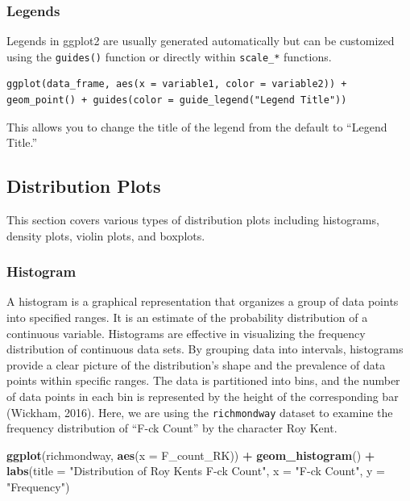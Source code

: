 \documentclass[
]{book}
\newenvironment{Shaded}{\begin{snugshade}}{\end{snugshade}}
\newcommand{\AttributeTok}[1]{\textcolor[rgb]{0.13,0.29,0.53}{#1}}
\newcommand{\FunctionTok}[1]{\textcolor[rgb]{0.13,0.29,0.53}{\textbf{#1}}}
\newcommand{\NormalTok}[1]{#1}
\newcommand{\SpecialCharTok}[1]{\textcolor[rgb]{0.81,0.36,0.00}{\textbf{#1}}}
\newcommand{\StringTok}[1]{\textcolor[rgb]{0.31,0.60,0.02}{#1}}
\begin{document}
\subsubsection*{Legends}\label{legends}

Legends in ggplot2 are usually generated automatically but can be customized using the \texttt{guides()} function or directly within \texttt{scale\_*} functions.

\begin{verbatim}
ggplot(data_frame, aes(x = variable1, color = variable2)) + geom_point() + guides(color = guide_legend("Legend Title"))
\end{verbatim}

This allows you to change the title of the legend from the default to ``Legend Title.''

\subsection*{Distribution Plots}\label{distribution-plots}

This section covers various types of distribution plots including histograms, density plots, violin plots, and boxplots.

\subsubsection*{Histogram}\label{histogram}

A histogram is a graphical representation that organizes a group of data points into specified ranges. It is an estimate of the probability distribution of a continuous variable. Histograms are effective in visualizing the frequency distribution of continuous data sets. By grouping data into intervals, histograms provide a clear picture of the distribution's shape and the prevalence of data points within specific ranges. The data is partitioned into bins, and the number of data points in each bin is represented by the height of the corresponding bar (Wickham, 2016). Here, we are using the \texttt{richmondway} dataset to examine the frequency distribution of ``F-ck Count'' by the character Roy Kent.

\begin{Shaded}
\begin{Highlighting}[]
\FunctionTok{ggplot}\NormalTok{(richmondway, }\FunctionTok{aes}\NormalTok{(}\AttributeTok{x =}\NormalTok{ F\_count\_RK)) }\SpecialCharTok{+}
  \FunctionTok{geom\_histogram}\NormalTok{() }\SpecialCharTok{+}
  \FunctionTok{labs}\NormalTok{(}\AttributeTok{title =} \StringTok{"Distribution of Roy Kent\textquotesingle{}s F{-}ck Count"}\NormalTok{,}
       \AttributeTok{x =} \StringTok{"F{-}ck Count"}\NormalTok{,}
       \AttributeTok{y =} \StringTok{"Frequency"}\NormalTok{)}
\end{Highlighting}
\end{Shaded}
\end{document}
